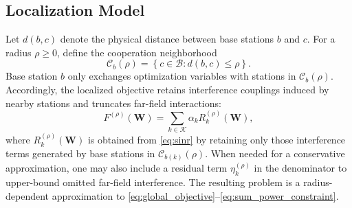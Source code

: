 \subsection{Localization Model}

Let $d(b,c)$ denote the physical distance between base stations $b$ and $c$. For a radius $\rho \ge 0$, define the cooperation neighborhood
\begin{equation}
\mathcal{C}_b(\rho) = \left\{ c \in \mathcal{B} : d(b,c) \le \rho \right\}.
\end{equation}
Base station $b$ only exchanges optimization variables with stations in $\mathcal{C}_b(\rho)$. Accordingly, the localized objective retains interference couplings induced by nearby stations and truncates far-field interactions:
\begin{equation}
F^{(\rho)}(\mathbf{W}) = \sum_{k \in \mathcal{K}} \alpha_k R_k^{(\rho)}(\mathbf{W}),
\label{eq:localized_objective}
\end{equation}
where $R_k^{(\rho)}(\mathbf{W})$ is obtained from \eqref{eq:sinr} by retaining only those interference terms generated by base stations in $\mathcal{C}_{b(k)}(\rho)$. When needed for a conservative approximation, one may also include a residual term $\eta_k^{(\rho)}$ in the denominator to upper-bound omitted far-field interference. The resulting problem is a radius-dependent approximation to \eqref{eq:global_objective}--\eqref{eq:sum_power_constraint}.
